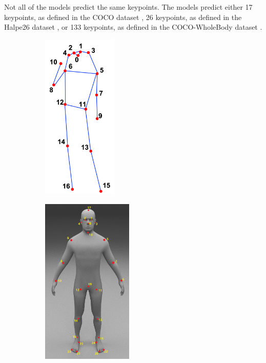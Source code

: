 Not all of the models predict the same keypoints. The models predict either 17 keypoints, as defined in the COCO dataset \cite{coco}, 26 keypoints, as defined in the Halpe26 dataset \cite{halpe}, or 133 keypoints, as defined in the COCO-WholeBody dataset \cite{coco-wholebody}.

\begin{figure}[htbp]
    \centering
    \begin{subfigure}[b]{0.2\textwidth}
        \centering

        \includegraphics[height=8cm]{obrazky-figures/coco_landmarks.png}
        \label{fig:image1}
    \end{subfigure}
    \hfill
    \begin{subfigure}[b]{0.25\textwidth}
        \centering

        \includegraphics[height=8cm]{obrazky-figures/halpe_landmarks.jpg}
        \label{fig:image2}
    \end{subfigure}
    \hfill
    \begin{subfigure}[b]{0.5\textwidth}
        \centering


\end{subfigure}
\end{figure}
